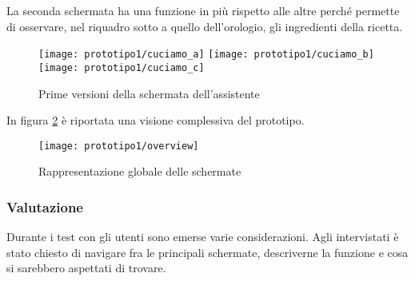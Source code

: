 La seconda schermata ha una funzione in più rispetto alle altre perché permette di osservare, nel riquadro sotto a quello dell'orologio, gli ingredienti della ricetta.

\clearpage
\begin{figure}[ht]
  \begin{center}
    \texttt{[image: prototipo1/cuciamo\_a]}
    \texttt{[image: prototipo1/cuciamo\_b]}
    \texttt{[image: prototipo1/cuciamo\_c]}
    \caption{Prime versioni della schermata dell'assistente}
    \label{fig:p1_cuciniamo}
  \end{center}
\end{figure}

\clearpage
In figura \ref{fig:p1_overview} è riportata una visione complessiva del prototipo.

\begin{figure}[ht]
  \begin{center}
    \texttt{[image: prototipo1/overview]}
    \caption{Rappresentazione globale delle schermate}
    \label{fig:p1_overview}
  \end{center}
\end{figure}

\subsubsection{Valutazione}
Durante i test con gli utenti sono emerse varie considerazioni.
Agli intervistati è stato chiesto di navigare fra le principali schermate, descriverne la funzione e cosa si sarebbero aspettati di trovare.

